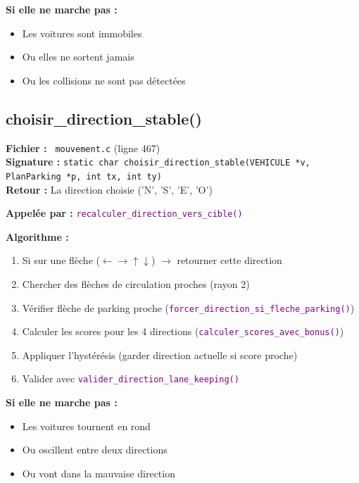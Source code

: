 \documentclass[11pt,a4paper]{article}
\newcommand{\code}[1]{\texttt{\textcolor{accent}{#1}}}
\newcommand{\fichier}[1]{\texttt{\textcolor{primary}{\faIcon{file-code} #1}}}
\newcommand{\fonction}[1]{\texttt{\textcolor{purple}{#1()}}}
\begin{document}
\textbf{Si elle ne marche pas :}
\begin{itemize}[noitemsep]
    \item Les voitures sont immobiles
    \item Ou elles ne sortent jamais
    \item Ou les collisions ne sont pas détectées
\end{itemize}

\subsection{choisir\_direction\_stable()}

\begin{funcbox}
\textbf{Fichier :} \fichier{mouvement.c} (ligne 467)\\
\textbf{Signature :} \code{static char choisir\_direction\_stable(VEHICULE *v, PlanParking *p, int tx, int ty)}\\
\textbf{Retour :} La direction choisie ('N', 'S', 'E', 'O')
\end{funcbox}

\textbf{Appelée par :} \fonction{recalculer\_direction\_vers\_cible}

\textbf{Algorithme :}
\begin{enumerate}[noitemsep]
    \item Si sur une flèche ($\leftarrow\rightarrow\uparrow\downarrow$) $\rightarrow$ retourner cette direction
    \item Chercher des flèches de circulation proches (rayon 2)
    \item Vérifier flèche de parking proche (\fonction{forcer\_direction\_si\_fleche\_parking})
    \item Calculer les scores pour les 4 directions (\fonction{calculer\_scores\_avec\_bonus})
    \item Appliquer l'hystérésis (garder direction actuelle si score proche)
    \item Valider avec \fonction{valider\_direction\_lane\_keeping}
\end{enumerate}

\textbf{Si elle ne marche pas :}
\begin{itemize}[noitemsep]
    \item Les voitures tournent en rond
    \item Ou oscillent entre deux directions
    \item Ou vont dans la mauvaise direction
\end{itemize}
\end{document}
